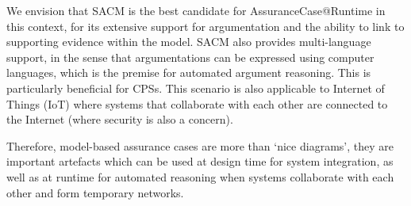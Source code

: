 We envision that SACM is the best candidate for AssuranceCase@Runtime in this context, for its extensive support for argumentation and the ability to link to supporting evidence within the model. 
SACM also provides multi-language support, in the sense that argumentations can be expressed using computer languages, which is the premise for automated argument reasoning. This is particularly beneficial for CPSs.
This scenario is also applicable to Internet of Things (IoT) where systems that collaborate with each other are connected to the Internet (where security is also a concern). 

Therefore, model-based assurance cases are more than `nice diagrams', they are important artefacts which can be used at design time for system integration, as well as at runtime for automated reasoning when systems collaborate with each other and form temporary networks. 